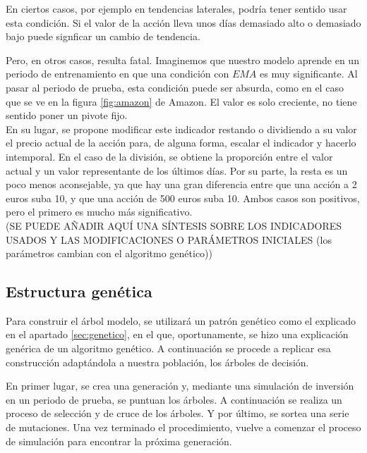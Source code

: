 En ciertos casos, por ejemplo en tendencias laterales, podr\'ia tener sentido usar esta condici\'on. Si el valor de la acci\'on lleva unos d\'ias demasiado alto o demasiado bajo puede signficar un cambio de tendencia.

Pero, en otros casos, resulta fatal. Imaginemos que nuestro modelo aprende en un periodo de entrenamiento en que una condici\'on con $EMA$ es muy significante. Al pasar al periodo de prueba, esta condici\'on puede ser absurda, como en el caso que se ve en la figura \ref{fig:amazon} de Amazon. El valor es solo creciente, no tiene sentido poner un pivote fijo.\\

En su lugar, se propone modificar este indicador restando o dividiendo a su valor el precio actual de la acci\'on para, de alguna forma, escalar el indicador y hacerlo intemporal. En el caso de la divisi\'on, se obtiene la proporci\'on entre el valor actual y un valor representante de los \'ultimos d\'ias. Por su parte, la resta es un poco menos aconsejable, ya que hay una gran diferencia entre que una acci\'on a 2 euros suba 10, y que una acci\'on de 500 euros suba 10. Ambos casos son positivos, pero el primero es mucho m\'as significativo. \\



(SE PUEDE A\~NADIR AQU\'I UNA S\'INTESIS SOBRE LOS INDICADORES USADOS Y LAS MODIFICACIONES O PAR\'AMETROS INICIALES (los par\'ametros cambian con el algoritmo genético))

\subsection{Estructura gen\'etica}
Para construir el \'arbol modelo, se utilizar\'a un patr\'on gen\'etico como el explicado en el apartado \ref{sec:genetico}, en el que, oportunamente, se hizo una explicaci\'on gen\'erica de un algoritmo gen\'etico. A continuaci\'on se procede a replicar esa construcci\'on adapt\'andola a nuestra poblaci\'on, los \'arboles de decisi\'on.

En primer lugar, se crea una generaci\'on y, mediante una simulaci\'on de inversi\'on en un periodo de prueba, se puntuan los \'arboles. A continuaci\'on se realiza un proceso de selecci\'on y de cruce de los \'arboles. Y por \'ultimo, se sortea una serie de mutaciones. Una vez terminado el procedimiento, vuelve a comenzar el proceso de simulaci\'on para encontrar la pr\'oxima generaci\'on.\\

